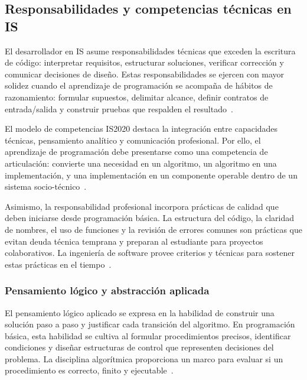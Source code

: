 \documentclass[12pt,twoside]{book}
\begin{document}
				\subsection{Responsabilidades y competencias técnicas en IS}
					\noindent
					El desarrollador en IS asume responsabilidades técnicas que exceden la escritura de código: interpretar requisitos, estructurar soluciones, verificar corrección y comunicar decisiones de diseño. Estas responsabilidades se ejercen con mayor solidez cuando el aprendizaje de programación se acompaña de hábitos de razonamiento: formular supuestos, delimitar alcance, definir contratos de entrada/salida y construir pruebas que respalden el resultado~\cite{Kendall2014Systems,Tegarden2025Systems,Ghezzi2003Fundamentals}.
						
					El modelo de competencias IS2020 destaca la integración entre capacidades técnicas, pensamiento analítico y comunicación profesional. Por ello, el aprendizaje de programación debe presentarse como una competencia de articulación: convierte una necesidad en un algoritmo, un algoritmo en una implementación, y una implementación en un componente operable dentro de un sistema socio-técnico~\cite{Leidig2021Competency,Leidig2020Updating,Laudon2020Management}.
					
					Asimismo, la responsabilidad profesional incorpora prácticas de calidad que deben iniciarse desde programación básica. La estructura del código, la claridad de nombres, el uso de funciones y la revisión de errores comunes son prácticas que evitan deuda técnica temprana y preparan al estudiante para proyectos colaborativos. La ingeniería de software provee criterios y técnicas para sostener estas prácticas en el tiempo~\cite{Sommerville2015Software,Pressman2019Software,Martin2008Clean}.
					
					\subsubsection{Pensamiento lógico y abstracción aplicada}
						\noindent
						El pensamiento lógico aplicado se expresa en la habilidad de construir una solución paso a paso y justificar cada transición del algoritmo. En programación básica, esta habilidad se cultiva al formular procedimientos precisos, identificar condiciones y diseñar estructuras de control que representen decisiones del problema. La disciplina algorítmica proporciona un marco para evaluar si un procedimiento es correcto, finito y ejecutable~\cite{Wirth1976Algorithms,Hanly2015Problem,Gaddis2022Starting}.
						
\end{document}
